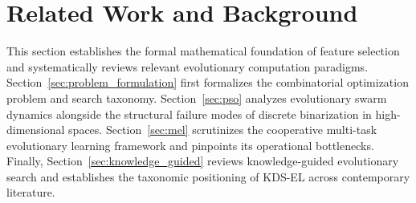 \section{Related Work and Background}\label{sec:related}

This section establishes the formal mathematical foundation of feature selection and systematically reviews relevant evolutionary computation paradigms. Section~\ref{sec:problem_formulation} first formalizes the combinatorial optimization problem and search taxonomy. Section~\ref{sec:pso} analyzes evolutionary swarm dynamics alongside the structural failure modes of discrete binarization in high-dimensional spaces. Section~\ref{sec:mel} scrutinizes the cooperative multi-task evolutionary learning framework and pinpoints its operational bottlenecks. Finally, Section~\ref{sec:knowledge_guided} reviews knowledge-guided evolutionary search and establishes the taxonomic positioning of KDS-EL across contemporary literature.

